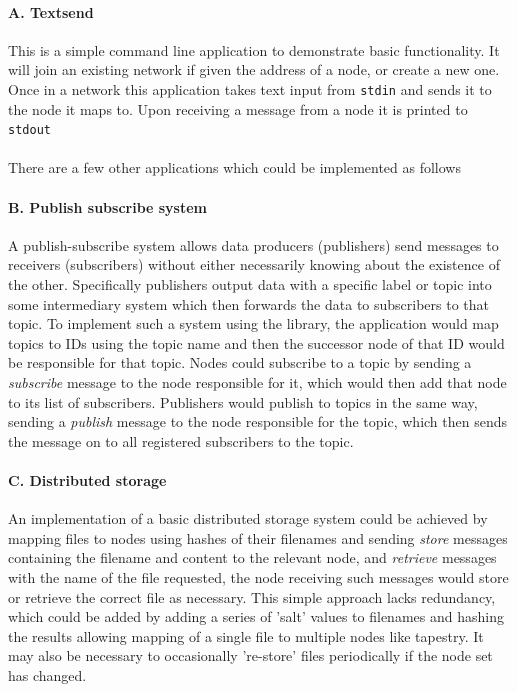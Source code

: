 \documentclass{article}
\begin{document}
\paragraph{A. Textsend}

This is a simple command line application to demonstrate basic functionality. It will join an existing network if given the address of a node, or create a new one. Once in a network this application takes text input from \texttt{stdin} and sends it to the node it maps to. Upon receiving a message from a node it is printed to \texttt{stdout}
\\
\\

\noindent
There are a few other applications which could be implemented as follows

\paragraph{B. Publish subscribe system} A publish-subscribe system allows data producers (publishers) send messages to receivers (subscribers) without either necessarily knowing about the existence of the other. Specifically publishers output data with a specific label or topic into some intermediary system which then forwards the data to subscribers to that topic.
To implement such a system using the library, the application would map topics to IDs using the topic name and then the successor node of that ID would be responsible for that topic. Nodes could subscribe to a topic by sending a \textit{subscribe} message to the node responsible for it, which would then add that node to its list of subscribers. Publishers would publish to topics in the same way, sending a \textit{publish} message to the node responsible for the topic, which then sends the message on to all registered subscribers to the topic.


\paragraph{C. Distributed storage} An implementation of a basic distributed storage system could be achieved by mapping files to nodes using hashes of their filenames and sending \textit{store} messages containing the filename and content to the relevant node, and \textit{retrieve} messages with the name of the file requested, the node receiving such messages would store or retrieve the correct file as necessary. This simple approach lacks redundancy, which could be added by adding a series of 'salt' values to filenames and hashing the results allowing mapping of a single file to multiple nodes like tapestry. It may also be necessary to occasionally 're-store' files periodically if the node set has changed.
\end{document}
